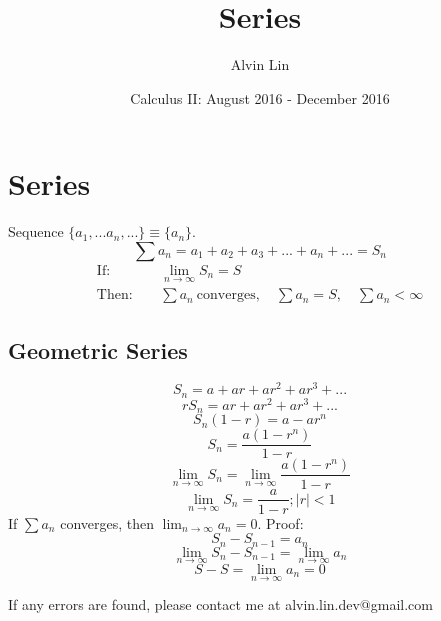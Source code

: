\documentclass[letterpaper, 12pt]{article}
\title{Series}
\author{Alvin Lin}
\date{Calculus II: August 2016 - December 2016}
\begin{document}
\maketitle

\section*{Series}
Sequence \( \bigg\{a_{1},...a_{n},...\bigg\} \equiv \bigg\{a_{n}\bigg\} \).
\[ \sum{a_{n}} = a_{1}+a_{2}+a_{3}+...+a_{n}+... = S_{n} \]
\begin{align*}
  \mathrm{If:} & \quad \lim_{n\to\infty}{S_{n}} = S \\
  \mathrm{Then:} & \quad \sum{a_{n}} \mathrm{\ converges},
    \quad \sum{a_{n}} = S, \quad \sum{a_{n}}<\infty
\end{align*}

\subsection*{Geometric Series}
\[ S_{n} = a+ar+ar^{2}+ar^{3}+... \]
\[ rS_{n} = ar+ar^{2}+ar^{3}+... \]
\[ S_{n}(1-r) = a-ar^{n} \]
\[ S_{n} = \frac{a(1-r^{n})}{1-r} \]
\[ \lim_{n\to\infty}{S_{n}} = \lim_{n\to\infty}{\frac{a(1-r^{n})}{1-r}} \]
\[ \lim_{n\to\infty}{S_{n}} = \frac{a}{1-r}; |r| < 1 \]
If \( \sum{a_{n}} \) converges, then \( \lim_{n\to\infty}{a_{n}} = 0 \). Proof:
\[ S_{n}-S_{n-1} = a_{n} \]
\[ \lim_{n\to\infty}{S_{n}-S_{n-1}} = \lim_{n\to\infty}{a_{n}} \]
\[ S-S = \lim_{n\to\infty}{a_{n}} = 0 \]


\begin{center}
  If any errors are found, please contact me at alvin.lin.dev@gmail.com
\end{center}
\end{document}
